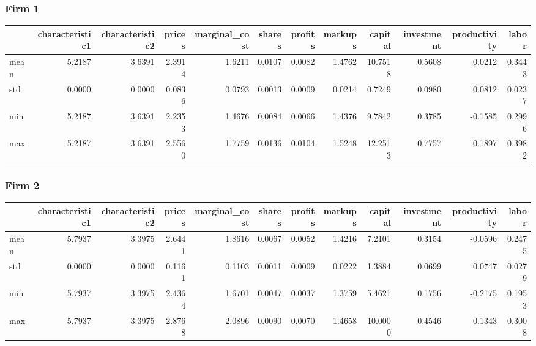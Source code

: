  \subsubsection*{Firm 1}
\begin{tabular}{lrrrrrrrrrrr}
\toprule
{} &  characteristic1 &  characteristic2 &  prices &  marginal\_cost &  shares &  profits &  markups &  capital &  investment &  productivity &  labor \\
\midrule
mean &           5.2187 &           3.6391 &  2.3914 &         1.6211 &  0.0107 &   0.0082 &   1.4762 &  10.7518 &      0.5608 &        0.0212 & 0.3443 \\
std  &           0.0000 &           0.0000 &  0.0836 &         0.0793 &  0.0013 &   0.0009 &   0.0214 &   0.7249 &      0.0980 &        0.0812 & 0.0237 \\
min  &           5.2187 &           3.6391 &  2.2353 &         1.4676 &  0.0084 &   0.0066 &   1.4376 &   9.7842 &      0.3785 &       -0.1585 & 0.2996 \\
max  &           5.2187 &           3.6391 &  2.5560 &         1.7759 &  0.0136 &   0.0104 &   1.5248 &  12.2513 &      0.7757 &        0.1897 & 0.3982 \\
\bottomrule
\end{tabular}


 \subsubsection*{Firm 2}
\begin{tabular}{lrrrrrrrrrrr}
\toprule
{} &  characteristic1 &  characteristic2 &  prices &  marginal\_cost &  shares &  profits &  markups &  capital &  investment &  productivity &  labor \\
\midrule
mean &           5.7937 &           3.3975 &  2.6441 &         1.8616 &  0.0067 &   0.0052 &   1.4216 &   7.2101 &      0.3154 &       -0.0596 & 0.2475 \\
std  &           0.0000 &           0.0000 &  0.1161 &         0.1103 &  0.0011 &   0.0009 &   0.0222 &   1.3884 &      0.0699 &        0.0747 & 0.0279 \\
min  &           5.7937 &           3.3975 &  2.4364 &         1.6701 &  0.0047 &   0.0037 &   1.3759 &   5.4621 &      0.1756 &       -0.2175 & 0.1953 \\
max  &           5.7937 &           3.3975 &  2.8768 &         2.0896 &  0.0090 &   0.0070 &   1.4658 &  10.0000 &      0.4546 &        0.1343 & 0.3008 \\
\bottomrule
\end{tabular}



